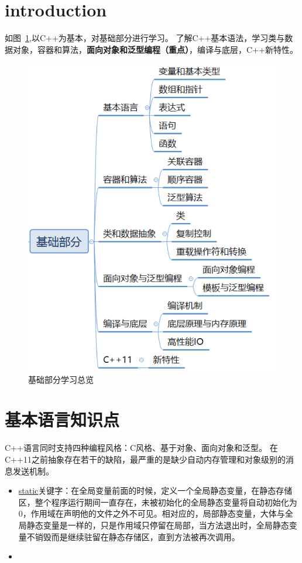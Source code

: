 \section{introduction}

如图~\ref{fig:overview},以C++为基本，对基础部分进行学习。
了解C++基本语法，学习类与数据对象，容器和算法，\textbf{面向对象和泛型编程（重点）}，编译与底层，C++新特性。

\begin{figure}[]
	\centering
	\includegraphics[width=0.5\columnwidth]{pic/overview.png}
	\caption{基础部分学习总览}
	\label{fig:overview}
\end{figure}

\section{基本语言知识点}
C++语言同时支持四种编程风格：C风格、基于对象、面向对象和泛型。
在C++11之前抽象存在若干的缺陷，最严重的是缺少自动内存管理和对象级别的消息发送机制。

\begin{itemize}
	\item \underline{static}关键字：在全局变量前面的时候，定义一个全局静态变量，在静态存储区，整个程序运行期间一直存在，未被初始化的全局静态变量将自动初始化为0，作用域在声明他的文件之外不可见。相对应的，局部静态变量，大体与全局静态变量是一样的，只是作用域只停留在局部，当方法退出时，全局静态变量不销毁而是继续驻留在静态存储区，直到方法被再次调用。
	\item 
\end{itemize}
